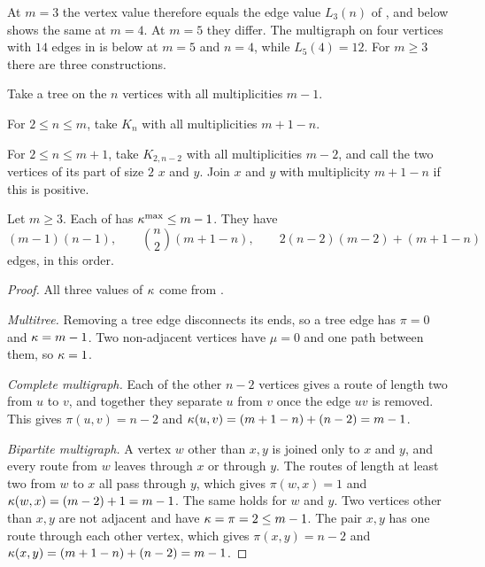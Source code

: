 At $m = 3$ the vertex value therefore equals the edge value $L_3(n)$ of , and  below shows the same at $m=4$.
At $m=5$ they differ. The multigraph on four vertices with $14$ edges in  is  below at $m=5$ and $n=4$, while $L_5(4)=12$.
For $m \ge 3$ there are three constructions.

\begin{construction}[Multitree]\label{const:multi-tree}
Take a tree on the $n$ vertices with all multiplicities $m-1$.
\end{construction}

\begin{construction}\label{const:multi-complete}
For $2 \le n \le m$, take $K_n$ with all multiplicities $m+1-n$.
\end{construction}

\begin{construction}\label{const:multi-bipartite}
For $2 \le n \le m+1$, take $K_{2,n-2}$ with all multiplicities $m-2$, and call the two vertices of its part of size $2$ $x$ and $y$. Join $x$ and $y$ with multiplicity $m+1-n$ if this is positive.
\end{construction}

\begin{proposition}\label{prop:multi-three}
Let $m \ge 3$. Each of  has $\kappa^{\max} \le m-1$. They have
\[
    (m-1)(n-1),\qquad \binom{n}{2}(m+1-n),\qquad 2(n-2)(m-2) + (m+1-n)
\]
edges, in this order.
\end{proposition}

\begin{proof}
All three values of $\kappa$ come from .

\emph{Multitree.} Removing a tree edge disconnects its ends, so a tree edge has $\pi = 0$ and $\kappa = m-1$.
Two non-adjacent vertices have $\mu = 0$ and one path between them, so $\kappa = 1$.

\emph{Complete multigraph.} Each of the other $n-2$ vertices gives a route of length two from $u$ to $v$, and together they separate $u$ from $v$ once the edge $uv$ is removed.
This gives $\pi(u,v) = n-2$ and $\kappa(u,v) = (m+1-n) + (n-2) = m-1$.

\emph{Bipartite multigraph.} A vertex $w$ other than $x,y$ is joined only to $x$ and $y$, and every route from $w$ leaves through $x$ or through $y$.
The routes of length at least two from $w$ to $x$ all pass through $y$, which gives $\pi(w,x) = 1$ and $\kappa(w,x) = (m-2) + 1 = m-1$. The same holds for $w$ and $y$.
Two vertices other than $x,y$ are not adjacent and have $\kappa = \pi = 2 \le m-1$.
The pair $x,y$ has one route through each other vertex, which gives $\pi(x,y) = n-2$ and $\kappa(x,y) = (m+1-n) + (n-2) = m-1$.
\end{proof}

